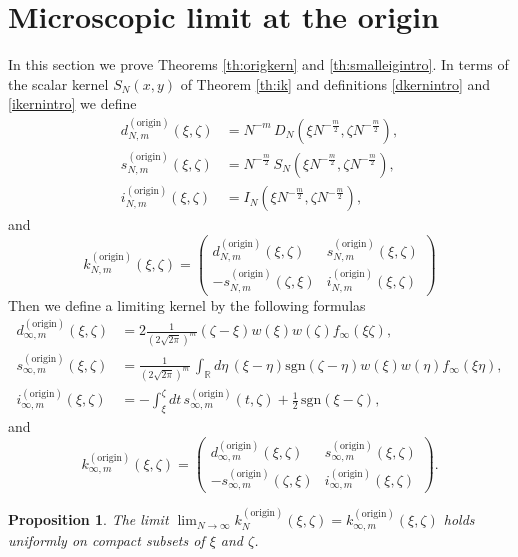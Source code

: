 \documentclass[11pt,reqno]{amsproc}
\newtheorem{proposition}[theorem]{Proposition}
\numberwithin{equation}{section}
\numberwithin{theorem}{section}
\begin{document}
\section{Microscopic limit at the origin}
\label{se:smallest}
In this section we prove Theorems \ref{th:origkern}  and \ref{th:smalleigintro}. In terms of the scalar kernel $S_{N}(x,y)$ of Theorem \ref{th:ik} and definitions \eqref{dkernintro} and \eqref{ikernintro} we define
\begin{align}
d^{(\mathrm{origin})}_{N,m}(\xi,\zeta) &= N^{-m}\,D_{N}(\xi N^{-\frac{m}{2}},\zeta N^{-\frac{m}{2}}),\\
s^{(\mathrm{origin})}_{N,m}(\xi,\zeta) &= N^{-\frac{m}{2}}\,S_{N}(\xi N^{-\frac{m}{2}},\zeta N^{-\frac{m}{2}}),\\
i^{(\mathrm{origin})}_{N,m}(\xi,\zeta) &= I_{N}(\xi N^{-\frac{m}{2}},\zeta N^{-\frac{m}{2}}),
\end{align}
and
\begin{equation}
k^{(\mathrm{origin})}_{N,m}(\xi,\zeta) = \begin{pmatrix} d^{(\mathrm{origin})}_{N,m}(\xi,\zeta) & s^{(\mathrm{origin})}_{N,m}(\xi,\zeta)\\ -s^{(\mathrm{origin})}_{N,m}(\zeta,\xi) & i^{(\mathrm{origin})}_{N,m}(\xi,\zeta) \end{pmatrix}
\end{equation}
Then we define a limiting kernel by the following formulas
\begin{align}
d^{(\mathrm{origin})}_{\infty,m}(\xi,\zeta) &= 2\frac{1}{(2\sqrt{2\pi})^{m}}(\zeta-\xi)w(\xi)w(\zeta)f_{\infty}(\xi \zeta),\\
s^{(\mathrm{origin})}_{\infty,m}(\xi,\zeta) &= \frac{1}{(2\sqrt{2\pi})^{m}}\,\int_{\mathbb{R}}d\eta\,(\xi-\eta)\mathrm{sgn}(\zeta-\eta)w(\xi)w(\eta)f_{\infty}(\xi \eta),\\
i^{(\mathrm{origin})}_{\infty,m}(\xi,\zeta) &= -\int_{\xi}^{\zeta}dt\,s^{(\mathrm{origin})}_{\infty,m}(t,\zeta)+\frac{1}{2}\,\mathrm{sgn}(\xi-\zeta),
\end{align}
and
\begin{equation}
k^{(\mathrm{origin})}_{\infty,m}(\xi,\zeta) = \begin{pmatrix} d^{(\mathrm{origin})}_{\infty,m}(\xi,\zeta) & s^{(\mathrm{origin})}_{\infty,m}(\xi,\zeta)\\ -s^{(\mathrm{origin})}_{\infty,m}(\zeta,\xi) & i_{\infty,m}^{(\mathrm{origin})}(\xi,\zeta) \end{pmatrix}. \label{koriglim}
\end{equation}
\begin{proposition}
\label{prop:kernolim}
The limit $\lim_{N \to \infty}k_{N}^{(\mathrm{origin})}(\xi,\zeta) = k^{(\mathrm{origin})}_{\infty,m}(\xi,\zeta)$ holds uniformly on compact subsets of $\xi$ and $\zeta$.
\end{proposition}
\end{document}

